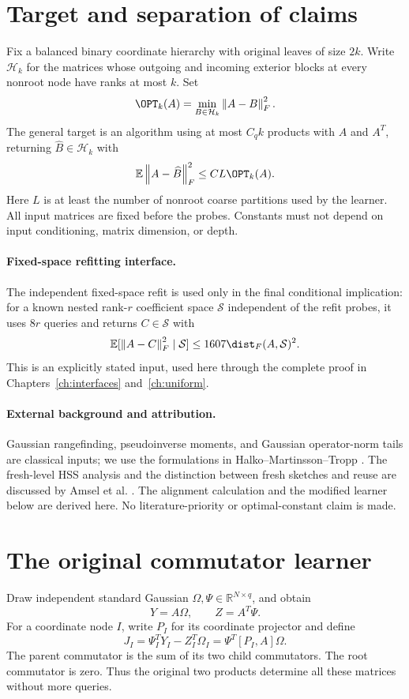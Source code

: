 \documentclass[11pt,oneside,openany,a4paper]{book}
\numberwithin{equation}{chapter}
\theoremstyle{definition}
\theoremstyle{remark}
\newcommand{\R}{\mathbb R}\newcommand{\E}{\mathbb E}\newcommand{\Prb}{\mathbb P}\newcommand{\PP}{\mathbb P}
\newcommand{\F}[1]{\left\lVert#1\right\rVert_F}
\newcommand{\HH}{\mathcal H}\newcommand{\SSS}{\mathcal S}
\begin{document}
\section{Target and separation of claims}
Fix a balanced binary coordinate hierarchy with original leaves of size $2k$. Write $\HH_k$ for the matrices whose outgoing and incoming exterior blocks at every nonroot node have ranks at most $k$. Set
\[
 \OPT_k(A)=\min_{B\in\HH_k}\F{A-B}^2.
\]
The general target is an algorithm using at most $C_q k$ products with $A$ and $A^T$, returning $\widehat B\in\HH_k$ with
\begin{equation}\label{actual:eq:target}
 \E\F{A-\widehat B}^2\le C L\OPT_k(A).
\end{equation}
Here $L$ is at least the number of nonroot coarse partitions used by the learner. All input matrices are fixed before the probes. Constants must not depend on input conditioning, matrix dimension, or depth.

\paragraph{Fixed-space refitting interface.}
The independent fixed-space refit is used only in the final conditional implication: for a known nested rank-$r$ coefficient space $\SSS$ independent of the refit probes, it uses $8r$ queries and returns $C\in\SSS$ with
\begin{equation}\label{actual:eq:refit}
 \E[\F{A-C}^2\mid\SSS]\le1607\dist_F(A,\SSS)^2.
\end{equation}
This is an explicitly stated input, used here through the complete proof in Chapters~\ref{ch:interfaces} and~\ref{ch:uniform}.

\paragraph{External background and attribution.}
Gaussian rangefinding, pseudoinverse moments, and Gaussian operator-norm tails are classical inputs; we use the formulations in Halko--Martinsson--Tropp \cite{HMT}. The fresh-level HSS analysis and the distinction between fresh sketches and reuse are discussed by Amsel et al. \cite{AmselHSS}. The alignment calculation and the modified learner below are derived here. No literature-priority or optimal-constant claim is made.

\section{The original commutator learner}
Draw independent standard Gaussian $\Omega,\Psi\in\R^{N\times q}$, and obtain
\[
 Y=A\Omega,\qquad Z=A^T\Psi.
\]
For a coordinate node $I$, write $P_I$ for its coordinate projector and define
\begin{equation}\label{actual:eq:J}
 J_I=\Psi_I^TY_I-Z_I^T\Omega_I
     =\Psi^T[P_I,A]\Omega.
\end{equation}
The parent commutator is the sum of its two child commutators. The root commutator is zero. Thus the original two products determine all these matrices without more queries.
\end{document}
